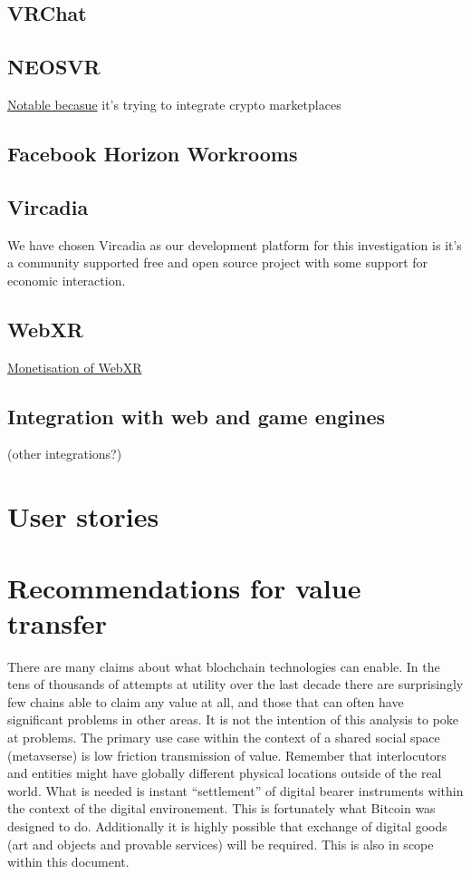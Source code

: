 \subsection{VRChat}
\lipsum[50]
\subsection{NEOSVR}
\href{https://neos.com/}{Notable becasue} it's trying to integrate crypto marketplaces
\subsection{Facebook Horizon Workrooms}
\lipsum[50]
\subsection{Vircadia}
We have chosen Vircadia as our development platform for this investigation is it's a community supported free and open source project with some support for economic interaction.
\subsection{WebXR}
\href{https://hackmd.io/@XR/monetization}{Monetisation of WebXR}
\lipsum[50]
\subsection{Integration with web and game engines} (other integrations?) 
\section{User stories}
\lipsum[50]
\section{Recommendations for value transfer}
There are many claims about what blochchain technologies can enable. In the tens of thousands of attempts at utility over the last decade there are surprisingly few chains able to claim any value at all, and those that can often have significant problems in other areas. It is not the intention of this analysis to poke at problems. The primary use case within the context of a shared social space (metavserse) is low friction transmission of value. Remember that interlocutors and entities might have globally different physical locations outside of the real world. What is needed is instant ``settlement'' of digital bearer instruments within the context of the digital environement. This is fortunately what Bitcoin was designed to do. Additionally it is highly possible that exchange of digital goods (art and objects and provable services) will be required. This is also in scope within this document.
